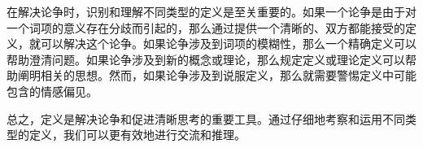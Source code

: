 在解决论争时，识别和理解不同类型的定义是至关重要的。如果一个论争是由于对一个词项的意义存在分歧而引起的，那么通过提供一个清晰的、双方都能接受的定义，就可以解决这个论争。如果论争涉及到词项的模糊性，那么一个精确定义可以帮助澄清问题。如果论争涉及到新的概念或理论，那么规定定义或理论定义可以帮助阐明相关的思想。然而，如果论争涉及到说服定义，那么就需要警惕定义中可能包含的情感偏见。

总之，定义是解决论争和促进清晰思考的重要工具。通过仔细地考察和运用不同类型的定义，我们可以更有效地进行交流和推理。

\begin{center}
\end{center} 